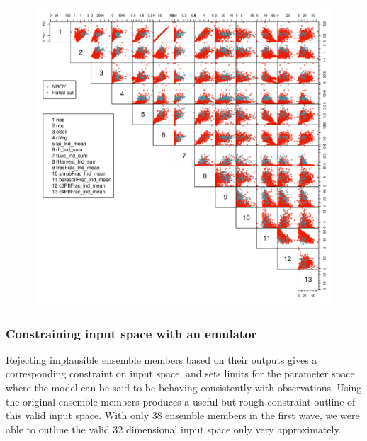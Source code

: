 \documentclass[gmd, manuscript]{copernicus}
\begin{document}
\begin{figure}[t]
\includegraphics[width=12cm]{./figs/output_pairs.pdf}
\caption{}
\label{fig:output_pairs}
\end{figure}


\subsubsection{Constraining input space with an emulator}\label{sssec:constraining_input_space_emulator}

Rejecting implausible ensemble members based on their outputs gives a corresponding constraint on input space, and sets limits for the parameter space where the model can be said to be behaving consistently with observations. Using the original ensemble members produces a useful but rough constraint outline of this valid input space. With only 38 ensemble members in the first wave, we were able to outline the valid 32 dimensional input space only very approximately.
\end{document}
